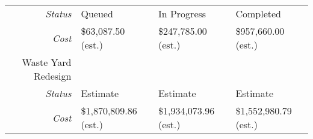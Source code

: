 \begin{tabularx}{\textwidth}{r|X|X|X|}
    \multicolumn{1}{|r|}{\cellcolor{ccorangelight}\textit{Status}}                & Queued                                                         & In Progress                                                         & Completed                                                         \\
    \multicolumn{1}{|r|}{\cellcolor{ccorangelight}\textit{Cost}}                  & \$63,087.50  (est.)                                                     & \$247,785.00 (est.)                                                     & \$957,660.00  (est.)                                                     \\ \hline
\multicolumn{1}{|V{.2\columnwidth}|}{\cellcolor{ccorangelight}Waste Yard Redesign}          &                                                                  &                                                                  &                                                                  \\
    \multicolumn{1}{|r|}{\cellcolor{ccorangelight}\textit{Status}}                & Estimate                                                         & Estimate                                                         & Estimate                                                         \\
    \multicolumn{1}{|r|}{\cellcolor{ccorangelight}\textit{Cost}}                  & \$1,870,809.86  (est.)                                                     & \$1,934,073.96  (est.)                                                     & \$1,552,980.79  (est.)                                                     \\ \hline
\end{tabularx}